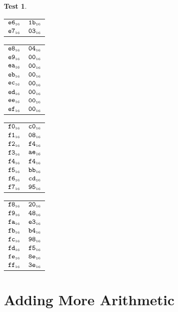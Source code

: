 \documentclass[a4paper,12pt]{article}
\makeatletter
\newcommand{\num}[1]{\texttt{\MakeLowercase{#1}}}
\newcommand{\hex}[1]{\num{#1}_{\textup{\tiny 16}}}
\newcommand{\MEM}[1]{\ifthenelse{\equal{#1}{}}{M}{M[#1]}}
\theoremstyle{definition}
\newtheorem{test}{Test}
\newenvironment{memtable}{%
  \begin{trivlist}
    \item
    }{%
    \end{trivlist}}
\newenvironment{memcolumn}{%
  \begin{tabular}{@{}ll@{}}
    \hline}
    {%
    \hline
  \end{tabular}}
\newcommand{\memspace}{\qquad}
\makeatother
\begin{document}
\begin{test}
\begin{memtable}
\begin{memcolumn}
      $\hex{E6}$ & $\hex{1B}$ \\
      $\hex{E7}$ & $\hex{03}$ \\
    \end{memcolumn}
    \memspace
    \begin{memcolumn}
      $\hex{E8}$ & $\hex{04}$ \\
      $\hex{E9}$ & $\hex{00}$ \\
      $\hex{EA}$ & $\hex{00}$ \\
      $\hex{EB}$ & $\hex{00}$ \\
      $\hex{EC}$ & $\hex{00}$ \\
      $\hex{ED}$ & $\hex{00}$ \\
      $\hex{EE}$ & $\hex{00}$ \\
      $\hex{EF}$ & $\hex{00}$ \\
    \end{memcolumn}
    \memspace
    \begin{memcolumn}
      $\hex{F0}$ & $\hex{C0}$ \\
      $\hex{F1}$ & $\hex{08}$ \\
      $\hex{F2}$ & $\hex{F4}$ \\
      $\hex{F3}$ & $\hex{AE}$ \\
      $\hex{F4}$ & $\hex{F4}$ \\
      $\hex{F5}$ & $\hex{BB}$ \\
      $\hex{F6}$ & $\hex{CD}$ \\
      $\hex{F7}$ & $\hex{95}$ \\
    \end{memcolumn}
    \memspace
    \begin{memcolumn}
      $\hex{F8}$ & $\hex{20}$ \\
      $\hex{F9}$ & $\hex{48}$ \\
      $\hex{FA}$ & $\hex{E3}$ \\
      $\hex{FB}$ & $\hex{B4}$ \\
      $\hex{FC}$ & $\hex{98}$ \\
      $\hex{FD}$ & $\hex{F5}$ \\
      $\hex{FE}$ & $\hex{8E}$ \\
      $\hex{FF}$ & $\hex{3E}$ \\
    \end{memcolumn}
  \end{memtable}
\end{test}

\section{Adding More Arithmetic}
\end{document}
